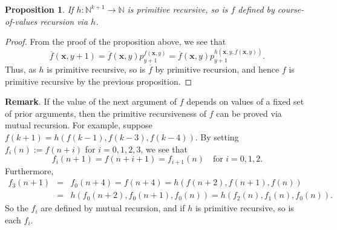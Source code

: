 \documentclass[12pt]{article}
\newtheorem{prop}{Proposition}
\begin{document}
\begin{prop} If $h: \mathbb{N}^{k+1} \to \mathbb{N}$ is primitive recursive, so is $f$ defined by course-of-values recursion via $h$. \end{prop}
\begin{proof} From the proof of the proposition above, we see that $$\overline{f}(\boldsymbol{x},y+1)= \overline{f}(\boldsymbol{x},y) p_{y+1}^{f(\boldsymbol{x},y)} = \overline{f}(\boldsymbol{x},y) p_{y+1}^{h(\boldsymbol{x},y, \overline{f}(\boldsymbol{x},y))}.$$  Thus, as $h$ is primitive recursive, so is $\overline{f}$ by primitive recursion, and hence $f$ is primitive recursive by the previous proposition.
\end{proof}

\textbf{Remark}.  If the value of the next argument of $f$ depends on values of a fixed set of prior arguments, then the primitive recursiveness of $f$ can be proved via mutual recursion.  For example, suppose $f(k+1)=h(f(k-1),f(k-3),f(k-4))$.  By setting $f_i(n):=f(n+i)$ for $i=0,1,2,3$, we see that $$f_i(n+1)=f(n+i+1)=f_{i+1}(n) \quad \mbox{for }i=0,1,2.$$  Furthermore, 
\begin{eqnarray*}
f_3(n+1) &=&  f_0(n+4)=f(n+4)=h(f(n+2),f(n+1),f(n)) \\ &=& h(f_0(n+2),f_0(n+1),f_0(n))=h(f_2(n),f_1(n),f_0(n)).
\end{eqnarray*}
So the $f_i$ are defined by mutual recursion, and if $h$ is primitive recursive, so is each $f_i$.
\end{document}
